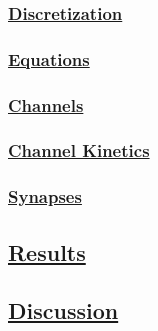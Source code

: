 \documentclass[12pt]{article}
\begin{document}
\subsubsection*{\href{pub-purkinje-deschutter-discretization/pub-purkinje-deschutter-discretization.tex}{\bf Discretization}}

\subsubsection*{\href{pub-purkinje-deschutter-equations/pub-purkinje-deschutter-equations.tex}{\bf Equations}}

\subsubsection*{\href{pub-purkinje-deschutter-channels/pub-purkinje-deschutter-channels.tex}{\bf Channels}}

\subsubsection*{\href{pub-purkinje-deschutter-kinetics/pub-purkinje-deschutter-kinetics.tex}{\bf Channel Kinetics}}

\subsubsection*{\href{pub-purkinje-deschutter-synapses/pub-purkinje-deschutter-synapses.tex}{\bf Synapses}}

\subsection*{\href{pub-purkinje-deschutter-results/pub-purkinje-deschutter-results.tex}{\bf Results}}

\subsection*{\href{pub-purkinje-deschutter-discussion/pub-purkinje-deschutter-discussion.tex}{\bf Discussion}}
\end{document}
